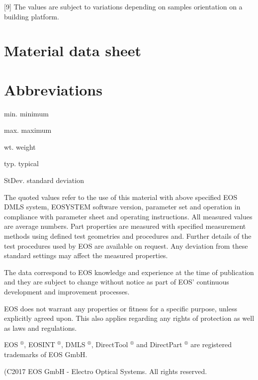 \documentclass[10pt]{article}
\begin{document}
[9] The values are subject to variations depending on samples orientation on a building platform.

\section*{Material data sheet}
\section*{Abbreviations}
min. minimum

max. maximum

wt. weight

typ. typical

StDev. standard deviation

The quoted values refer to the use of this material with above specified EOS DMLS system, EOSYSTEM software version, parameter set and operation in compliance with parameter sheet and operating instructions. All measured values are average numbers. Part properties are measured with specified measurement methods using defined test geometries and procedures and. Further details of the test procedures used by EOS are available on request. Any deviation from these standard settings may affect the measured properties.

The data correspond to EOS knowledge and experience at the time of publication and they are subject to change without notice as part of EOS' continuous development and improvement processes.

EOS does not warrant any properties or fitness for a specific purpose, unless explicitly agreed upon. This also applies regarding any rights of protection as well as laws and regulations.

EOS $^{\circledR}$, EOSINT $^{\circledR}$, DMLS $^{\circledR}$, DirectTool $^{\circledR}$ and DirectPart ${ }^{\circledR}$ are registered trademarks of EOS $\mathrm{GmbH}$.

(C2017 EOS GmbH - Electro Optical Systems. All rights reserved.
\end{document}
